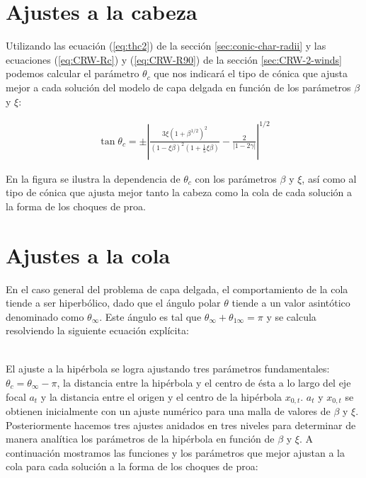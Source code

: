 \section{Ajustes a la cabeza}

Utilizando las ecuación (\ref{eq:thc2})  de la sección \ref{sec:conic-char-radii} y las ecuaciones
(\ref{eq:CRW-Rc}) y (\ref{eq:CRW-R90}) de la sección \ref{sec:CRW-2-winds} podemos calcular el parámetro
$\theta_c$ que nos indicará el tipo de cónica que ajusta mejor a cada solución del modelo de capa delgada
en función de los parámetros $\beta$ y $\xi$: 

 \begin{align}
   \tan\theta_c = \pm\left|\frac{3\xi\left(1 + \beta^{1/2}\right)^2}{\left(1 - \xi\beta\right)^2
   \left(1 + \frac{1}{5}\xi\beta\right)} - \frac{2}{\left|1 - 2\gamma\right|}\right|^{1/2}
 \end{align}

 En la figura  se ilustra la dependencia de $\theta_c$ con los parámetros $\beta$ y $\xi$, así como al tipo de
 cónica que ajusta mejor tanto la cabeza como la cola de cada solución a la forma de los choques de proa.
 
 \section{Ajustes a la cola}

 En el caso general del problema de capa delgada, el comportamiento de la cola tiende a ser hiperbólico, dado que
 el ángulo polar $\theta$ tiende a un valor asintótico denominado como $\theta_\infty$. Este ángulo es tal que
 $\theta_\infty + \theta_{1\infty} = \pi$ y se calcula resolviendo la siguiente ecuación explícita:

 \begin{align}
   
 \end{align}

 El ajuste a la hipérbola se logra ajustando tres parámetros fundamentales: $\theta_c = \theta_\infty - \pi$,
 la distancia entre la hipérbola y el centro de ésta a lo largo del eje focal $a_t$ y la distancia entre el origen
 y el centro de la hipérbola $x_{0,t}$. $a_t$ y $x_{0,t}$ se obtienen inicialmente con un ajuste numérico para una
 malla de valores de $\beta$ y $\xi$. Posteriormente hacemos tres ajustes anidados en tres niveles para determinar
 de manera analítica los parámetros de la hipérbola en función de $\beta$ y $\xi$. A continuación mostramos las
 funciones y los parámetros que mejor ajustan a la cola para cada solución a la forma de los choques de proa:

